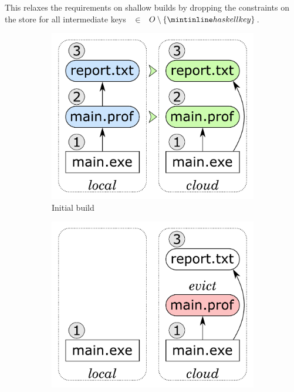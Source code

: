\noindent
This relaxes the requirements on shallow builds by dropping the constraints on
the  store for all intermediate keys ~$\in$~$O\setminus \{\hs{key}\}$.

\begin{figure}
\begin{subfigure}[b]{0.32\linewidth}
\centerline{\includegraphics[scale=0.26]{fig/frankenbuild-example-build.pdf}}
\caption{Initial build}
\end{subfigure}
\begin{subfigure}[b]{0.32\linewidth}
\centerline{\includegraphics[scale=0.26]{fig/frankenbuild-example-clean.pdf}}

\end{subfigure}
\end{figure}
